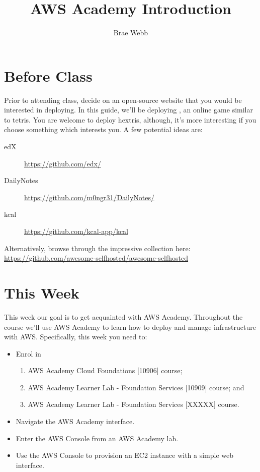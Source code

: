 \documentclass{csse4400}
\title{AWS Academy Introduction}
\author{Brae Webb}
\date{\week{1}}
\begin{document}
\maketitle

\section{Before Class}
Prior to attending class, decide on an open-source website that you would be interested in deploying.
In this guide, we'll be deploying  \cite{hextris}, an online game similar to tetris.
You are welcome to deploy hextris, although,
it's more interesting if you choose something which interests you.
A few potential ideas are:
\begin{description}
    \item[edX] \url{https://github.com/edx/}
    \item[DailyNotes] \url{https://github.com/m0ngr31/DailyNotes/}
    \item[kcal] \url{https://github.com/kcal-app/kcal} 
\end{description}

\noindent Alternatively, browse through the impressive collection here:\\ \url{https://github.com/awesome-selfhosted/awesome-selfhosted}

\section{This Week}
This week our goal is to get acquainted with AWS Academy.
Throughout the course we'll use AWS Academy to learn how to deploy and manage infrastructure with AWS.
Specifically, this week you need to:
\begin{itemize}
    \item Enrol in
    \begin{enumerate}
        \item AWS Academy Cloud Foundations [10906] course;
        \item AWS Academy Learner Lab - Foundation Services [10909] course; and
        \item AWS Academy Learner Lab - Foundation Services [XXXXX] course. 
    \end{enumerate}
    \item Navigate the AWS Academy interface.
    \item Enter the AWS Console from an AWS Academy lab.
    \item Use the AWS Console to provision an EC2 instance with a simple web interface.
\end{itemize}
\end{document}
